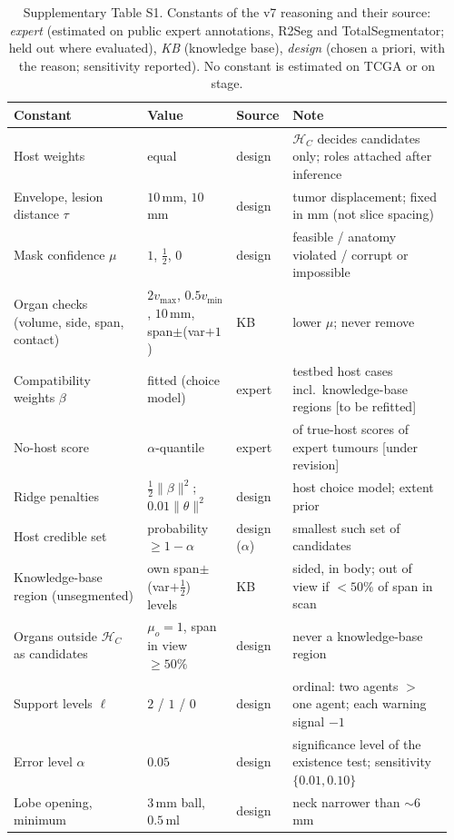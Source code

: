 \documentclass[fleqn,10pt]{olplainarticle}
\begin{document}
\begin{table}[t]
\centering\footnotesize
\caption{Supplementary Table S1. Constants of the v7 reasoning and their source: \emph{expert} (estimated on public expert
annotations, R2Seg and TotalSegmentator; held out where evaluated), \emph{KB} (knowledge base), \emph{design} (chosen a priori,
with the reason; sensitivity reported). No constant is estimated on TCGA or on stage.}
\label{tab:constants}
\setlength{\tabcolsep}{3pt}
\begin{tabular}{p{0.30\linewidth}p{0.20\linewidth}p{0.10\linewidth}p{0.36\linewidth}}
\hline
Constant & Value & Source & Note\\
\hline
Host weights & equal & design & $\mathcal{H}_C$ decides candidates only; roles attached after inference\\
Envelope, lesion distance $\tau$ & $10$\,mm, $10$\,mm & design & tumor displacement; fixed in mm (not slice spacing)\\
Mask confidence $\mu$ & $1$, $\tfrac12$, $0$ & design & feasible / anatomy violated / corrupt or impossible\\
Organ checks (volume, side, span, contact) & $2v_{\max}$, $0.5v_{\min}$, $10$\,mm, span$\pm$(var$+1$) & KB & lower $\mu$; never remove\\
Compatibility weights $\beta$ & fitted (choice model) & expert & testbed host cases incl.\ knowledge-base regions [to be refitted]\\
No-host score & $\alpha$-quantile & expert & of true-host scores of expert tumours [under revision]\\
Ridge penalties & $\tfrac12\|\beta\|^2$; $0.01\|\theta\|^2$ & design & host choice model; extent prior\\
Host credible set & probability $\ge1-\alpha$ & design ($\alpha$) & smallest such set of candidates\\
Knowledge-base region (unsegmented) & own span$\pm$(var$+\tfrac12$) levels & KB & sided, in body; out of view if $<50\%$ of span in scan\\
Organs outside $\mathcal{H}_C$ as candidates & $\mu_o=1$, span in view $\ge50\%$ & design & never a knowledge-base region\\
Support levels $\ell$ & $2$ / $1$ / $0$ & design & ordinal: two agents $>$ one agent; each warning signal $-1$\\
Error level $\alpha$ & $0.05$ & design & significance level of the existence test; sensitivity $\{0.01,0.10\}$\\
Lobe opening, minimum & $3$\,mm ball, $0.5$\,ml & design & neck narrower than $\sim6$\,mm\\

\end{tabular}
\end{table}
\end{document}
